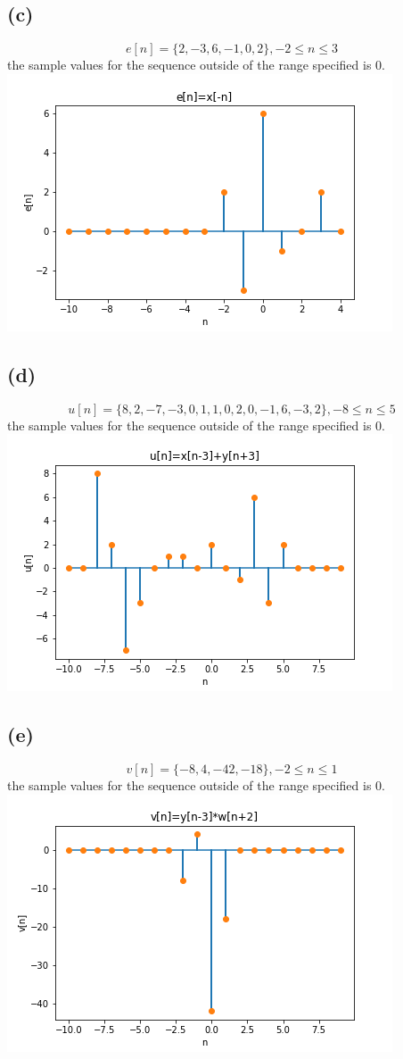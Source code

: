 \subsection*{(c)}
$$\boxed{e[n]=\{2, -3, 6, -1, 0, 2\}, -2\leq n \leq3}$$ 
the sample values for the sequence outside of the range specified
is 0.\\
\includegraphics[scale=0.5]{e.png}
\subsection*{(d)}
$$\boxed{u[n]=\{8, 2, -7, -3, 0, 1, 1, 0, 2, 0, -1, 6, -3, 2\}, 
-8\leq n \leq5}$$ 
the sample values for the sequence outside of the range specified
is 0.\\
\includegraphics[scale=0.5]{u.png}
\subsection*{(e)}
$$\boxed{v[n]=\{-8, 4, -42, -18\}, 
-2\leq n \leq1}$$ 
the sample values for the sequence outside of the range specified
is 0.\\
\includegraphics[scale=0.5]{v.png}

